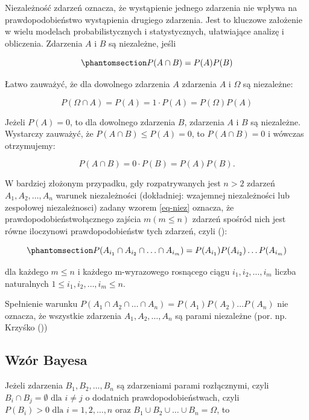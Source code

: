 \documentclass[
  letterpaper,
  DIV=11,
  numbers=noendperiod]{scrreprt}
\begin{document}
Niezależność zdarzeń oznacza, że wystąpienie jednego zdarzenia nie
wpływa na prawdopodobieństwo wystąpienia drugiego zdarzenia. Jest to
kluczowe założenie w wielu modelach probabilistycznych i statystycznych,
ułatwiające analizę i obliczenia. Zdarzenia \(A\) i \(B\) są niezależne,
jeśli

\begin{equation}\phantomsection\label{eq-niez}{P(A \cap B)= P(A)P(B)}\end{equation}

Łatwo zauważyć, że dla dowolnego zdarzenia \(A\) zdarzenia
\(A \text{ i } \Omega\) są niezależne:

\[P(\Omega \cap A) = P(A) = 1 \cdot P(A) = P(\Omega) P(A)\]

Jeżeli \(P(A) = 0\), to dla dowolnego zdarzenia \(B\), zdarzenia \(A\) i
\(B\) są niezależne. Wystarczy zauważyć, że
\(P(A \cap B) \le P(A) = 0\), to \(P(A \cap B)=0\) i wówczas
otrzymujemy:

\[P(A \cap B)=0 \cdot P(B) = P(A) P(B).\]

W bardziej złożonym przypadku, gdy rozpatrywanych jest \(n>2\) zdarzeń
\(A_1,A_2,\ldots,A_n\) warunek niezależności (dokładniej: wzajemnej
niezależności lub zespołowej niezależnosci) zadany wzorem \ref{eq-niez}
oznacza, że prawdopodobieństwołącznego zajścia \(m (m \le n)\) zdarzeń
spośród nich jest równe iloczynowi prawdopodobieństw tych zdarzeń, czyli
():

\begin{equation}\phantomsection\label{eq-niez_n}{ P(A_{i_1} \cap A_{i_2} \cap \ldots \cap A_{i_m} ) = P(A_{i_1}) P(A_{i_2}) \ldots P(A_{i_m}) }\end{equation}

dla każdego \(m \le n\) i każdego m-wyrazowego rosnącego ciągu
\(i_1, i_2, \ldots, i_m\) liczba naturalnych
\(1 \le i_1, i_2, \ldots, i_m \le n\).

Spełnienie warunku
\(P(A_1 \cap A_2 \cap \ldots \cap A_n) = P(A_1) P(A_2) \ldots P(A_n)\)
nie oznacza, że wszystkie zdarzenia \(A_1, A_2, \ldots, A_n\) są parami
niezależne (por. np. Krzyśko ())

\subsection{Wzór Bayesa}\label{wzuxf3r-bayesa}

Jeżeli zdarzenia \(B_1, B_2, \ldots, B_n\) są zdarzeniami parami
rozłącznymi, czyli \(B_i \cap B_j = \emptyset \text{ dla } i \neq j\) o
dodatnich prawdopodobieństwach, czyli
\(P(B_i) > 0 \text{ dla } i =1, 2, \ldots, n\) oraz
\(B_1 \cup B_2 \cup \ldots \cup B_n=\Omega\), to
\end{document}
